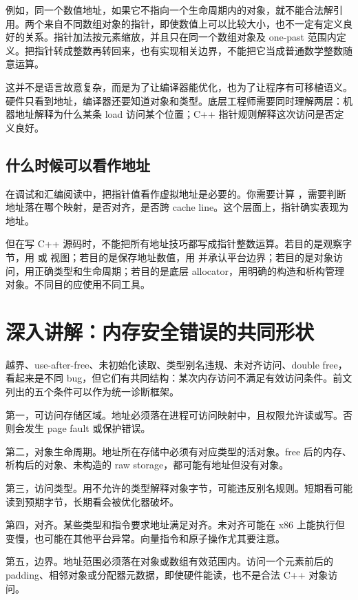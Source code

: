 例如，同一个数值地址，如果它不指向一个生命周期内的对象，就不能合法解引用。两个来自不同数组对象的指针，即使数值上可以比较大小，也不一定有定义良好的关系。指针加法按元素缩放，并且只在同一个数组对象及 one-past 范围内定义。把指针转成整数再转回来，也有实现相关边界，不能把它当成普通数学整数随意运算。

这并不是语言故意复杂，而是为了让编译器能优化，也为了让程序有可移植语义。硬件只看到地址，编译器还要知道对象和类型。底层工程师需要同时理解两层：机器地址解释为什么某条 load 访问某个位置；C++ 指针规则解释这次访问是否定义良好。

\subsection{什么时候可以看作地址}

在调试和汇编阅读中，把指针值看作虚拟地址是必要的。你需要计算 ，需要判断地址落在哪个映射，是否对齐，是否跨 cache line。这个层面上，指针确实表现为地址。

但在写 C++ 源码时，不能把所有地址技巧都写成指针整数运算。若目的是观察字节，用  或  视图；若目的是保存地址数值，用  并承认平台边界；若目的是对象访问，用正确类型和生命周期；若目的是底层 allocator，用明确的构造和析构管理对象。不同目的应使用不同工具。

\section{深入讲解：内存安全错误的共同形状}

越界、use-after-free、未初始化读取、类型别名违规、未对齐访问、double free，看起来是不同 bug，但它们有共同结构：某次内存访问不满足有效访问条件。前文列出的五个条件可以作为统一诊断框架。

第一，可访问存储区域。地址必须落在进程可访问映射中，且权限允许读或写。否则会发生 page fault 或保护错误。

第二，对象生命周期。地址所在存储中必须有对应类型的活对象。free 后的内存、析构后的对象、未构造的 raw storage，都可能有地址但没有对象。

第三，访问类型。用不允许的类型解释对象字节，可能违反别名规则。短期看可能读到预期字节，长期看会被优化器破坏。

第四，对齐。某些类型和指令要求地址满足对齐。未对齐可能在 x86 上能执行但变慢，也可能在其他平台异常。向量指令和原子操作尤其要注意。

第五，边界。地址范围必须落在对象或数组有效范围内。访问一个元素前后的 padding、相邻对象或分配器元数据，即使硬件能读，也不是合法 C++ 对象访问。

